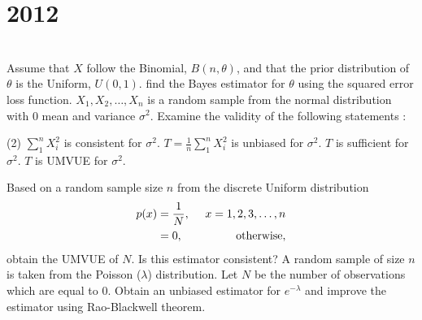 \section*{2012}
\vspace{-.5cm}
\hrulefill \smallskip\\
 Assume that $X$ follow the Binomial, $B(n,\theta)$, and that the prior distribution of $\theta$ is the Uniform, $U(0,1)$. find the Bayes estimator for $\theta$ using the squared error loss function.
\myline
{} $X_1,X_2,\dotsc,X_n$ is a random sample from the normal distribution with 0 mean and variance $\sigma^2$. Examine the validity of the following statements :
\begin{tasks}(2)
\task $\displaystyle \sum_1^n X_i^2$ is consistent for $\sigma^2$.
\task $\displaystyle T = \frac{1}{n}\sum_1^n X_i^2$ is unbiased for $\sigma^2$.
\task $T$ is sufficient for $\sigma^2$.
\task $T$ is UMVUE for $\sigma^2.$
\end{tasks}
 Based on a random sample size $n$ from the discrete Uniform distribution \[ \begin{aligned} p(x) &= \dfrac{1}{N}, \enskip &x=1,2,3,\dotsc,n\\
&=0, &\text{otherwise},
\end{aligned}\] obtain the UMVUE of $N$. Is this estimator consistent?
\myline
{} A random sample of size $n$ is taken from the Poisson ($\lambda$) distribution. Let $N$ be the number of observations which are equal to 0. Obtain an unbiased estimator for $e^{-\lambda}$ and improve the estimator using Rao-Blackwell theorem.